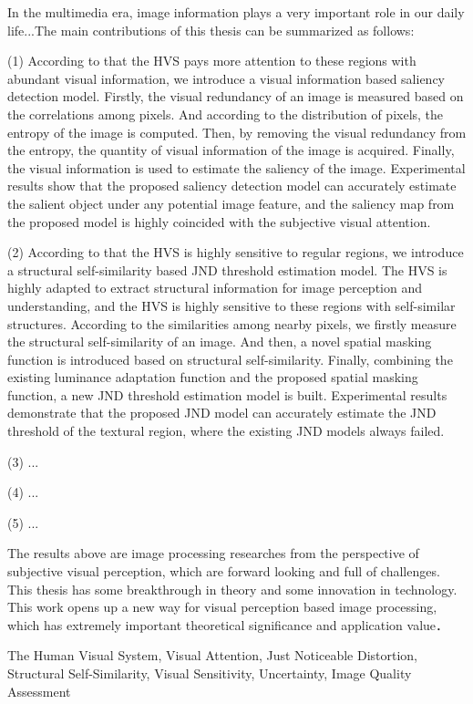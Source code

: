 \begin{eabstract}
In the multimedia era, image information plays a very important role in our daily life...The main contributions of this thesis can be summarized as follows:

(1) According to that the HVS pays more attention to these regions with abundant visual information, we introduce a visual information based saliency detection model. Firstly, the visual redundancy of an image is measured based on the correlations among pixels. And according to the distribution of pixels, the entropy of the image is computed. Then, by removing the visual redundancy from the entropy, the quantity of visual information of the image is acquired. Finally, the visual information is used to estimate the saliency of the image. Experimental results show that the proposed saliency detection model can accurately estimate the salient object under any potential image feature, and the saliency map from the proposed model is highly coincided with the subjective visual attention.

(2) According to that the HVS is highly sensitive to regular regions, we introduce a structural self-similarity based JND threshold estimation model. The HVS is highly adapted to extract structural information for image perception and understanding, and the HVS is highly sensitive to these regions with self-similar structures. According to the similarities among nearby pixels, we firstly measure the structural self-similarity of an image. And then, a novel spatial masking function is introduced based on structural self-similarity. Finally, combining the existing luminance adaptation function and the proposed spatial masking function, a new JND threshold estimation model is built. Experimental results demonstrate that the proposed JND model can accurately estimate the JND threshold of the textural region, where the existing JND models always failed.

(3) ...

(4) ...

(5) ...

The results above are image processing researches from the perspective of subjective visual perception, which are forward looking and full of challenges.  This thesis has some breakthrough in theory and some innovation in technology. This work opens up a new way for visual perception based image processing, which has extremely important theoretical significance and application value．


\end{eabstract}


\begin{ekeywords}
The Human Visual System, Visual Attention, Just Noticeable Distortion, Structural Self-Similarity, Visual Sensitivity, Uncertainty, Image Quality Assessment
\end{ekeywords}



